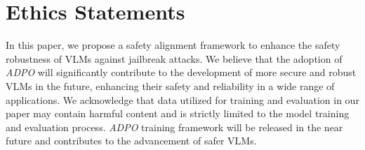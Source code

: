 \section*{Ethics Statements}
In this paper, we propose a safety alignment framework to enhance the safety robustness of VLMs against jailbreak attacks. We believe that the adoption of \textit{ADPO} will significantly contribute to the development of more secure and robust VLMs in the future, enhancing their safety and reliability in a wide range of applications. We acknowledge that data utilized for training and evaluation in our paper may contain harmful content and is strictly limited to the model training and evaluation process. \textit{ADPO} training framework will be released in the near future and contributes to the advancement of safer VLMs.